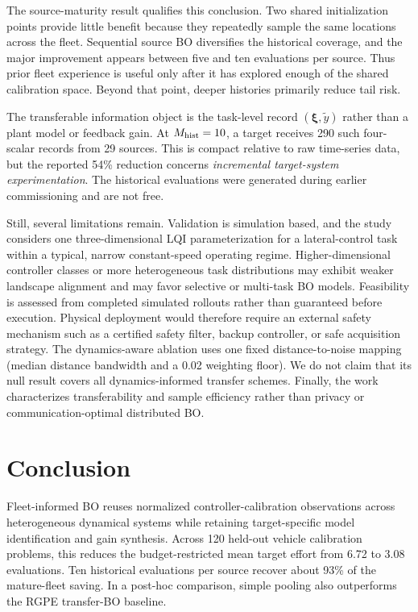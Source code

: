 \documentclass{l4dc2026}
\begin{document}
The source-maturity result qualifies this conclusion. Two shared initialization points provide little benefit because they repeatedly sample the same locations across the fleet. Sequential source BO diversifies the historical coverage, and the major improvement appears between five and ten evaluations per source. Thus prior fleet experience is useful only after it has explored enough of the shared calibration space. Beyond that point, deeper histories primarily reduce tail risk.

The transferable information object is the task-level record $(\boldsymbol{\xi},\tilde y)$ rather than a plant model or feedback gain. At $M_{\rm hist}=10$, a target receives 290 such four-scalar records from 29 sources. This is compact relative to raw time-series data, but the reported 54\% reduction concerns \emph{incremental target-system experimentation}. The historical evaluations were generated during earlier commissioning and are not free.

Still, several limitations remain. Validation is simulation based, and the study considers one three-dimensional LQI parameterization for a lateral-control task within a typical, narrow constant-speed operating regime. Higher-dimensional controller classes or more heterogeneous task distributions may exhibit weaker landscape alignment and may favor selective or multi-task BO models. Feasibility is assessed from completed simulated rollouts rather than guaranteed before execution. Physical deployment would therefore require an external safety mechanism such as a certified safety filter, backup controller, or safe acquisition strategy. The dynamics-aware ablation uses one fixed distance-to-noise mapping (median distance bandwidth and a 0.02 weighting floor). We do not claim that its null result covers all dynamics-informed transfer schemes.  Finally, the work characterizes transferability and sample efficiency rather than privacy or communication-optimal distributed BO.

\section{Conclusion}
Fleet-informed BO reuses normalized controller-calibration observations across heterogeneous dynamical systems while retaining target-specific model identification and gain synthesis. Across 120 held-out vehicle calibration problems, this reduces the budget-restricted mean target effort from 6.72 to 3.08 evaluations. Ten historical evaluations per source recover about 93\% of the mature-fleet saving. In a post-hoc comparison, simple pooling also outperforms the RGPE transfer-BO baseline. 


\end{document}
